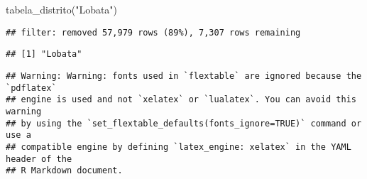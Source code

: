 \documentclass[
]{article}
\newenvironment{Shaded}{\begin{snugshade}}{\end{snugshade}}
\newcommand{\FunctionTok}[1]{\textcolor[rgb]{0.00,0.00,0.00}{#1}}
\newcommand{\NormalTok}[1]{#1}
\newcommand{\StringTok}[1]{\textcolor[rgb]{0.31,0.60,0.02}{#1}}
\begin{document}
\begin{Shaded}
\begin{Highlighting}[]
\FunctionTok{tabela\_distrito}\NormalTok{(}\StringTok{"Lobata"}\NormalTok{)}
\end{Highlighting}
\end{Shaded}

\begin{verbatim}
## filter: removed 57,979 rows (89%), 7,307 rows remaining
\end{verbatim}

\begin{verbatim}
## [1] "Lobata"
\end{verbatim}

\begin{verbatim}
## Warning: Warning: fonts used in `flextable` are ignored because the `pdflatex`
## engine is used and not `xelatex` or `lualatex`. You can avoid this warning
## by using the `set_flextable_defaults(fonts_ignore=TRUE)` command or use a
## compatible engine by defining `latex_engine: xelatex` in the YAML header of the
## R Markdown document.
\end{verbatim}

\providecommand{\docline}[3]{\noalign{\global\setlength{\arrayrulewidth}{#1}}\arrayrulecolor[HTML]{#2}\cline{#3}}

\setlength{\tabcolsep}{2pt}

\renewcommand*{\arraystretch}{1.5}
\end{document}
